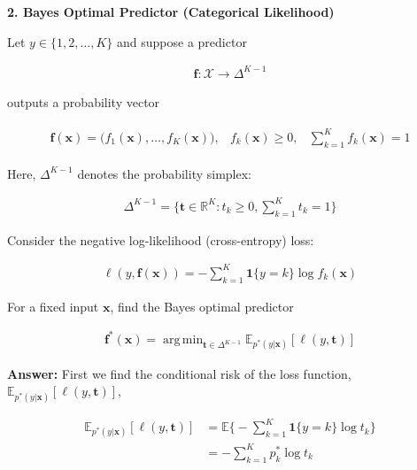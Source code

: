 \documentclass[11pt]{article}
\DeclareMathOperator*{\argmin}{arg\,min}
\begin{document}
    \Large \textbf{2. Bayes Optimal Predictor (Categorical Likelihood)}

    \large Let $y \in \{1, 2, \dots, K\}$ and suppose a predictor 

    \begin{align*}
        \mathbf{f}: \mathcal{X} \to \Delta^{K - 1}
    \end{align*}

    outputs a probability vector 

    \begin{align*}
        \begin{matrix}
        \mathbf{f}(\mathbf{x}) = \bigg(f_1(\mathbf{x}), \dots, f_K(\mathbf{x})\bigg), 
        & f_k(\mathbf{x}) \geq 0, 
        & \sum_{k = 1}^K f_k(\mathbf{x}) = 1
        \end{matrix}
    \end{align*}

    Here, $\Delta^{K -1}$ denotes the probability simplex:

    \begin{align*}
        \Delta^{K - 1} = \bigg\{\mathbf{t} \in \mathbb{R}^{K} : t_k \geq 0, \sum_{k = 1}^K t_k = 1
        \bigg\}
    \end{align*}

    Consider the negative log-likelihood (cross-entropy) loss:

    \begin{align*}
        \ell(y, \mathbf{f}(\mathbf{x})) = - \sum_{k = 1}^K \mathbf{1}\{y = k\} \log f_k(\mathbf{x})
    \end{align*}

    For a fixed input $\mathbf{x}$, find the Bayes optimal predictor

    \begin{align*}
        \mathbf{f}^*(\mathbf{x}) = \argmin_{\mathbf{t} \in \Delta^{K - 1}} \mathbb{E}_{p^*(y |
        \mathbf{x})}[\ell(y, \mathbf{t})]
    \end{align*}

    \textbf{Answer:} First we find the conditional risk of the loss function, $\mathbb{E}_{p^*(y |
    \mathbf{x})}[\ell(y, \mathbf{t})]$,

    \begin{align*}
        \mathbb{E}_{p^*(y|\mathbf{x})}[\ell(y, \mathbf{t})]
        &= \mathbb{E}\bigg\{-\sum_{k = 1}^K \mathbf{1}\{y = k\}\log t_k\bigg\} \\ 
        &= -\sum_{k = 1}^K p^*_k \log t_k
    \end{align*}
\end{document}
